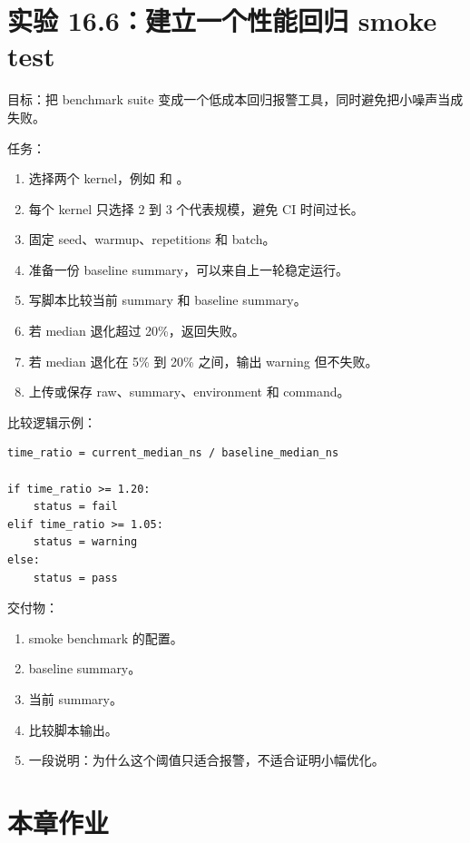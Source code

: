 \section{实验 16.6：建立一个性能回归 smoke test}

\begin{labbox}
目标：把 benchmark suite 变成一个低成本回归报警工具，同时避免把小噪声当成失败。

任务：

\begin{enumerate}
  \item 选择两个 kernel，例如  和 。
  \item 每个 kernel 只选择 2 到 3 个代表规模，避免 CI 时间过长。
  \item 固定 seed、warmup、repetitions 和 batch。
  \item 准备一份 baseline summary，可以来自上一轮稳定运行。
  \item 写脚本比较当前 summary 和 baseline summary。
  \item 若 median 退化超过 20\%，返回失败。
  \item 若 median 退化在 5\% 到 20\% 之间，输出 warning 但不失败。
  \item 上传或保存 raw、summary、environment 和 command。
\end{enumerate}

比较逻辑示例：

\begin{lstlisting}
time_ratio = current_median_ns / baseline_median_ns

if time_ratio >= 1.20:
    status = fail
elif time_ratio >= 1.05:
    status = warning
else:
    status = pass
\end{lstlisting}

交付物：

\begin{enumerate}
  \item smoke benchmark 的配置。
  \item baseline summary。
  \item 当前 summary。
  \item 比较脚本输出。
  \item 一段说明：为什么这个阈值只适合报警，不适合证明小幅优化。
\end{enumerate}
\end{labbox}

\section{本章作业}

